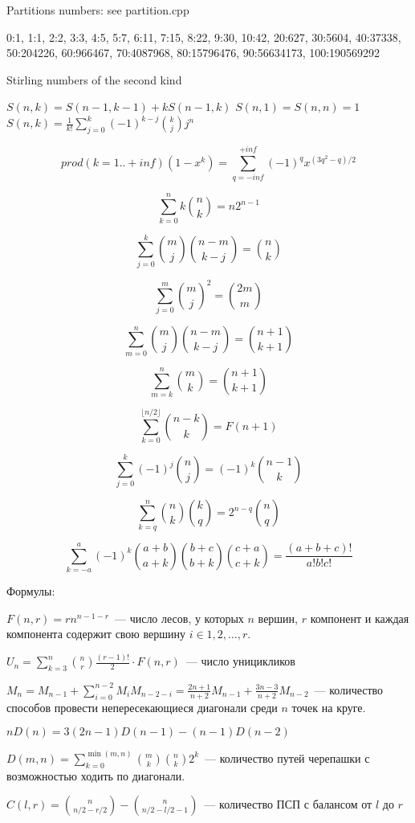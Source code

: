 Partitions numbers:
see partition.cpp

0:1, 1:1, 2:2, 3:3, 4:5, 5:7, 6:11, 7:15, 8:22, 9:30, 10:42, 20:627, 30:5604, 40:37338, 50:204226, 60:966467, 70:4087968, 80:15796476, 90:56634173, 100:190569292

Stirling numbers of the second kind

$S(n, k) = S(n - 1, k - 1) + kS(n - 1, k)$
$S(n, 1) = S(n, n) = 1$
$S(n, k) = \frac{1}{k!} \sum_{j=0}^{k}{(-1)^{k - j}\binom{k}{j}j^n}$

$$prod (k=1..+inf) (1-x^k) = \sum_{q=-inf}^{+inf} {(-1)^q x^{(3q^2-q)/2}}$$

$$\sum_{k = 0}^{n}{k \binom{n}{k}} = n 2^{n - 1}$$

$$\sum_{j = 0}^{k}{\binom{m}{j} \binom{n - m}{k - j}} = \binom{n}{k}$$

$$\sum_{j = 0}^{m}{\binom{m}{j}^2} = \binom{2m}{m}$$

$$\sum_{m = 0}^{n}{\binom{m}{j}\binom{n - m}{k - j}} = \binom{n + 1}{k + 1}$$

$$\sum_{m = k}^{n}{\binom{m}{k}} = \binom{n + 1}{k + 1}$$

$$\sum_{k = 0}^{\lfloor n / 2 \rfloor}{\binom{n - k}{k}} = F(n + 1)$$

$$\sum_{j = 0}^{k}{(-1)^{j} \binom{n}{j}} = (-1)^k \binom{n - 1}{k}$$

$$\sum_{k = q}^{n}{\binom{n}{k} \binom{k}{q}} = 2^{n - q}\binom{n}{q}$$

$$\sum_{k =-a}^{a}{(-1)^k \binom{a + b}{a + k} \binom{b + c}{b + k} \binom{c + a}{c + k} } = \frac{(a + b + c)!}{a! b! c!}$$

Формулы:

$F(n, r) = rn^{n - 1 - r}$~--- число лесов, у которых $n$ вершин, $r$ компонент и каждая компонента
содержит свою вершину $i \in 1, 2, \dots , r$. 

$U_n = \sum_{k=3}^{n}{\binom{n}{r} \frac{(r - 1)!}{2} \cdot F(n, r)}$~--- число уницикликов

$M_n = M_{n - 1} + \sum_{i=0}^{n-2}{M_i M_{n - 2 - i}} = \frac{2n + 1}{n + 2}M_{n - 1} + \frac{3n - 3}{n + 2}M_{n - 2}$~--- 
количество способов провести непересекающиеся диагонали среди $n$ точек на круге.

$nD(n) = 3(2n - 1)D(n - 1) - (n - 1)D(n - 2)$

$D(m, n) = \sum_{k=0}^{\min(m, n)}{\binom{m}{k} \binom{n}{k} 2^k}$~--- количество путей черепашки с возможностью ходить по диагонали.

$C(l, r) = \binom{n}{n / 2 - r / 2} - \binom{n}{n / 2 - l / 2 - 1}$~--- количество ПСП с балансом от $l$ до $r$